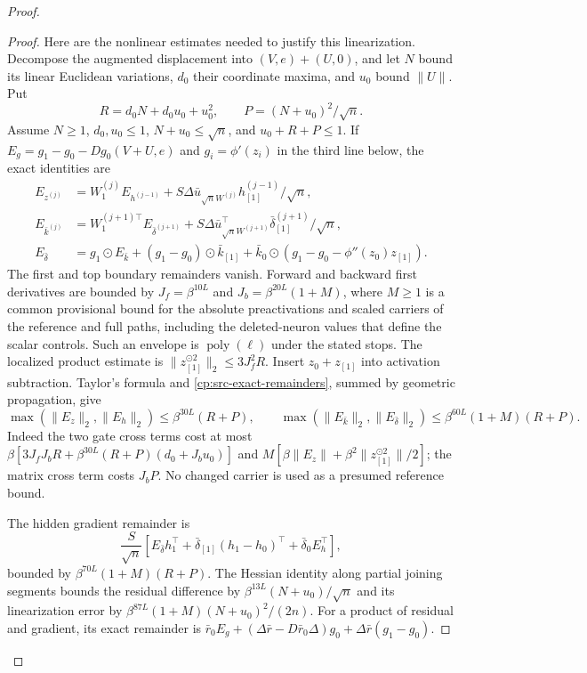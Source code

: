 \begin{proof}
\begin{proof}
Here are the nonlinear estimates needed to justify this linearization.
Decompose the augmented displacement into \((V,e)+(U,0)\), and let
\(N\) bound its linear Euclidean variations, \(d_0\) their coordinate
maxima, and \(u_0\) bound \(\|U\|\).  Put
\[
 R=d_0N+d_0u_0+u_0^2,\qquad P=(N+u_0)^2/\sqrt n.
\]
Assume \(N\ge1\), \(d_0,u_0\le1\), \(N+u_0\le\sqrt n\),
and \(u_0+R+P\le1\).  If \(E_g=g_1-g_0-Dg_0(V+U,e)\)
and \(g_i=\phi'(z_i)\) in the third line below, the exact identities are
\begin{align}
 E_{z^{(j)}}&=W_1^{(j)}E_{h^{(j-1)}}+
              S\Delta\bar u_{\sqrt nW^{(j)}}h_{[1]}^{(j-1)}/\sqrt n,
 \nonumber\\
 E_{\bar k^{(j)}}&=W_1^{(j+1)\top}E_{\bar\delta^{(j+1)}}+
 S\Delta\bar u_{\sqrt nW^{(j+1)}}^\top\bar\delta_{[1]}^{(j+1)}/\sqrt n,
 \nonumber\\
 E_{\bar\delta}&=g_1\odot E_{\bar k}
 +(g_1-g_0)\odot\bar k_{[1]}
 +\bar k_0\odot(g_1-g_0-\phi''(z_0)z_{[1]}).
 \label{cp:src-exact-remainders}
\end{align}
The first and top boundary remainders vanish.  Forward and backward
first derivatives are bounded by \(J_f=\beta^{10L}\) and
\(J_b=\beta^{20L}(1+M)\), where \(M\ge1\) is a common
provisional bound for the absolute preactivations and scaled carriers
of the reference and full paths, including the deleted-neuron values
that define the scalar controls. Such an envelope is
\(\operatorname{poly}(\ell)\) under the stated stops.
The localized product estimate is
\(\|z_{[1]}^{\odot2}\|_2\le3J_f^2R\).
Insert \(z_0+z_{[1]}\) into activation subtraction.  Taylor's formula
and \eqref{cp:src-exact-remainders}, summed by geometric propagation,
give
\begin{equation}
 \max(\|E_z\|_2,\|E_h\|_2)\le\beta^{30L}(R+P),\qquad
 \max(\|E_{\bar k}\|_2,\|E_{\bar\delta}\|_2)
       \le\beta^{60L}(1+M)(R+P).
 \label{cp:src-remainder-bounds}
\end{equation}
Indeed the two gate cross terms cost at most
\(\beta[3J_fJ_bR+\beta^{30L}(R+P)(d_0+J_bu_0)]\) and
\(M[\beta\|E_z\|+\beta^2\|z_{[1]}^{\odot2}\|/2]\);
the matrix cross term costs \(J_bP\).  No changed carrier is used
as a presumed reference bound.

The hidden gradient remainder is
\[
 \frac S{\sqrt n}
 [E_{\bar\delta}h_1^\top+
       \bar\delta_{[1]}(h_1-h_0)^\top+\bar\delta_0E_h^\top],
\]
bounded by \(\beta^{70L}(1+M)(R+P)\).
The Hessian identity along partial joining segments bounds the
residual difference by \(\beta^{13L}(N+u_0)/\sqrt n\) and its
linearization error by
\(\beta^{87L}(1+M)(N+u_0)^2/(2n)\).
For a product of residual and gradient, its exact remainder is
\(\bar r_0E_g+(\Delta\bar r-D\bar r_0\Delta)g_0
+\Delta\bar r(g_1-g_0)\).


\end{proof}
\end{proof}
